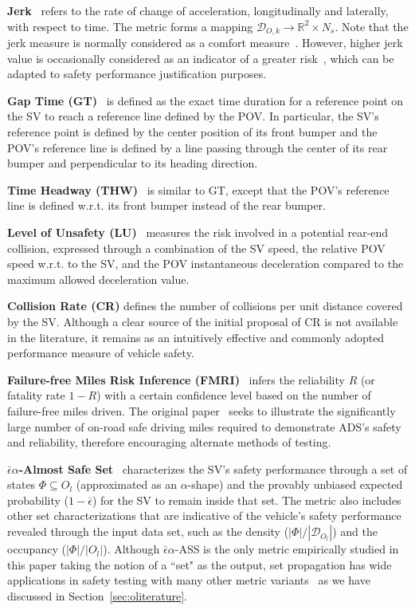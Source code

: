 \documentclass[journal]{IEEEtran}
\newcommand{\R}{\mathbb{R}}
\begin{document}
\textbf{Jerk}~\cite{bellem2018comfort} refers to the rate of change of acceleration, longitudinally and laterally, with respect to time. The metric forms a mapping $\mathcal{D}_{O, k} \rightarrow \R^2 \times N_s$. Note that the jerk measure is normally considered as a comfort measure~\cite{bellem2018comfort}. However, higher jerk value is occasionally considered as an indicator of a greater risk~\cite{bagdadi2013development}, which can be adapted to safety performance justification purposes.

\textbf{Gap Time (GT)}~\cite{vogel2002characterizes} is defined as the exact time duration for a reference point on the SV to reach a reference line defined by the POV. In particular, the SV's reference point is defined by the center position of its front bumper and the POV's reference line is defined by a line passing through the center of its rear bumper and perpendicular to its heading direction.

\textbf{Time Headway (THW)}~\cite{Jansson2005CollisionAT} is similar to GT, except that the POV's reference line is defined w.r.t. its front bumper instead of the rear bumper.

\textbf{Level of Unsafety (LU)}~\cite{barcelo2003safety} measures the risk involved in a potential rear-end collision, expressed through a combination of the SV speed, the relative POV speed w.r.t. to the SV, and the POV instantaneous deceleration compared to the maximum allowed deceleration value.

\textbf{Collision Rate (CR)} defines the number of collisions per unit distance covered by the SV. Although a clear source of the initial proposal of CR is not available in the literature, it remains as an intuitively effective and commonly adopted performance measure of vehicle safety.

\textbf{Failure-free Miles Risk Inference (FMRI)}~\cite{kalra2016driving} infers the reliability $R$ (or fatality rate $1-R$) with a certain confidence level based on the number of failure-free miles driven. The original paper~\cite{kalra2016driving} seeks to illustrate the significantly large number of on-road safe driving miles required to demonstrate ADS's safety and reliability, therefore encouraging alternate methods of testing.  

\textbf{$\bar{\epsilon}\alpha$-Almost Safe Set}~\cite{weng2023finite} characterizes the SV's safety performance through a set of states $\Phi \subseteq O_l$ (approximated as an $\alpha$-shape) and the provably unbiased expected probability ($1-\bar{\epsilon}$) for the SV to remain inside that set. The metric also includes other set characterizations that are indicative of the vehicle's safety performance revealed through the input data set, such as the density ($|\Phi|/|\mathcal{D}_{O_l}|$) and the occupancy ($|\Phi|/|O_l|$). Although $\bar{\epsilon}\alpha$-ASS is the only metric empirically studied in this paper taking the notion of a ``set" as the output, set propagation has wide applications in safety testing with many other metric variants~\cite{althoff2021set} as we have discussed in Section~\ref{sec:oliterature}. 
\end{document}
